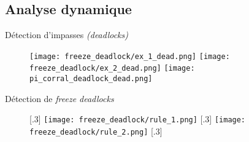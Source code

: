         \subsection{Analyse dynamique}

            \begin{frame}{Détection d'impasses \textit{(deadlocks)}}
                \begin{figure}
                    \centering
                        {\texttt{[image: freeze\_deadlock/ex\_1\_dead.png]}}
                        {\texttt{[image: freeze\_deadlock/ex\_2\_dead.png]}}
                        {\texttt{[image: pi\_corral\_deadlock\_dead.png]}}
                \end{figure}
            \end{frame}

            \begin{frame}{Détection de \textit{freeze deadlocks}}
                \begin{figure}
                    \centering
                    [.3\textwidth]
                    {\texttt{[image: freeze\_deadlock/rule\_1.png]}}
                    [.3\textwidth]
                    {\texttt{[image: freeze\_deadlock/rule\_2.png]}}
                    [.3\textwidth] {
                    }
                \end{figure}
            \end{frame}

